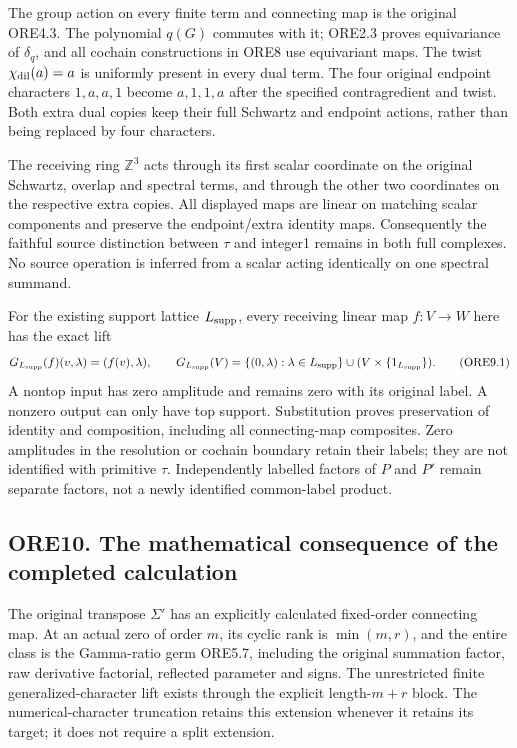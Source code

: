 The group action on every finite term and connecting map is the original
ORE4.3. The polynomial \(q(G)\) commutes with it; ORE2.3 proves
equivariance of \(\delta_q\), and all cochain constructions in ORE8 use
equivariant maps. The twist \(\chi_{\rm dil}(a)=a\) is uniformly present
in every dual term. The four original endpoint characters \(1,a,a,1\)
become \(a,1,1,a\) after the specified contragredient and twist. Both
extra dual copies keep their full Schwartz and endpoint actions, rather
than being replaced by four characters.

The receiving ring \(\mathbb Z^3\) acts through its first scalar
coordinate on the original Schwartz, overlap and spectral terms, and
through the other two coordinates on the respective extra copies. All
displayed maps are linear on matching scalar components and preserve the
endpoint/extra identity maps. Consequently the faithful source
distinction between \(\tau\) and integer1 remains in both full
complexes. No source operation is inferred from a scalar acting
identically on one spectral summand.

For the existing support lattice \(L_{\rm supp}\), every receiving
linear map \(f:V\to W\) here has the exact lift \[
G_{L_{\rm supp}}(f)(v,\lambda)=(f(v),\lambda),\qquad
G_{L_{\rm supp}}(V)=
\{(0,\lambda):\lambda\in L_{\rm supp}\}
\cup(V\times\{1_{L_{\rm supp}}\}).
\tag{ORE9.1}
\] A nontop input has zero amplitude and remains zero with its original
label. A nonzero output can only have top support. Substitution proves
preservation of identity and composition, including all connecting-map
composites. Zero amplitudes in the resolution or cochain boundary retain
their labels; they are not identified with primitive \(\tau\).
Independently labelled factors of \(P\) and \(P'\) remain separate
factors, not a newly identified common-label product.

\subsection{ORE10. The mathematical consequence of the completed
calculation}\label{ore10.-the-mathematical-consequence-of-the-completed-calculation}

The original transpose \(\Sigma'\) has an explicitly calculated
fixed-order connecting map. At an actual zero of order \(m\), its cyclic
rank is \(\min(m,r)\), and the entire class is the Gamma-ratio germ
ORE5.7, including the original summation factor, raw derivative
factorial, reflected parameter and signs. The unrestricted finite
generalized-character lift exists through the explicit length-\(m+r\)
block. The numerical-character truncation retains this extension
whenever it retains its target; it does not require a split extension.

